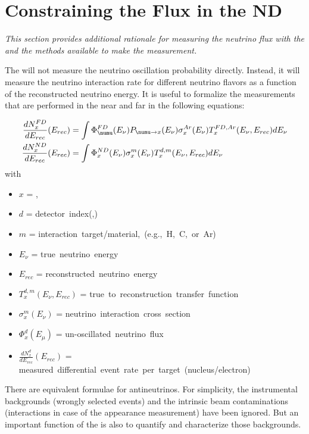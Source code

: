 \chapter{Constraining the Flux in the ND}
\label{sec:appx-nd:fluxappendix}

{\it This section provides additional rationale for measuring the neutrino flux with the   and the methods available to make the measurement.}

The    will not measure the neutrino oscillation probability directly. Instead, it will measure the neutrino interaction rate for different neutrino flavors as a function of the reconstructed neutrino energy. It is useful to formalize the measurements that are performed in the near and  far  in the following equations:


\begin{align}
\label{eq:fdrate}
\frac{dN^{FD}_{x}}{dE_{rec}}(E_{rec}) & = 
\int \Phi^{FD}_{\numu}(E_\nu)P_{\numu\rightarrow x}(E_\nu)\sigma^{Ar}_x(E_\nu)T^{FD,Ar}_x(E_\nu,E_{rec})dE_\nu\\
\frac{dN^{ND}_{x}}{dE_{rec}}(E_{rec}) & = 
\int \Phi^{ND}_{x}(E_\nu)\sigma^m_x(E_\nu)T^{d,m}_x(E_\nu,E_{rec})dE_\nu\
\end{align}
with
\begin{itemize}
    \item $x$  = \nue , \numu 
   \item $d$  = \mbox{detector index}(,) 
   \item $m$  = \mbox{interaction target/material, (e.g., H, C, or Ar)}
   \item $E_\nu$  = \mbox{true neutrino energy}
   \item $E_{rec}$  = \mbox{reconstructed neutrino energy} 
   \item $T^{d,m}_x(E_\nu,E_{rec})$  = \mbox{true to reconstruction transfer function} 
   \item $\sigma^m_x(E_\nu)$  = \mbox{neutrino interaction cross section} 
   \item $\Phi^{d}_x(E_\mu)$  = \mbox{un-oscillated neutrino flux} 
   \item $\frac{dN^{d}_{x}}{dE_{rec}}(E_{rec})$  = \mbox{measured differential event rate per target (nucleus/electron)} 
\end{itemize}


There are equivalent formulae for antineutrinos. For simplicity, the instrumental backgrounds (wrongly selected events) and the intrinsic beam contaminations (\nue interactions in case of the appearance measurement) have been ignored. But an important function of the   is also to quantify and characterize those backgrounds.

